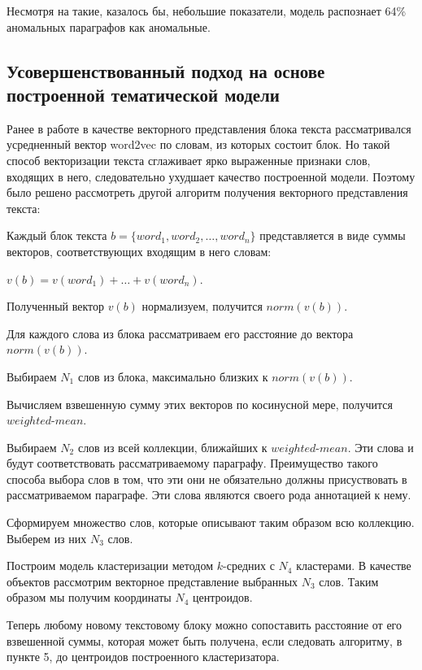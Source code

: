 \documentclass[12pt]{article}
\newcounter{c_tab}
\begin{document}
Несмотря на такие, казалось бы, небольшие показатели, модель распознает 64\% аномальных параграфов как аномальные.

\subsection{Усовершенствованный подход на основе построенной тематической модели}
Ранее в работе в качестве векторного представления блока текста рассматривался усредненный вектор word2vec по словам, из которых состоит блок. Но такой способ векторизации текста сглаживает ярко выраженные признаки слов, входящих в него, следовательно ухудшает качество построенной модели. Поэтому было решено рассмотреть другой алгоритм получения векторного представления текста:
\par\begin{enumerate}{
		\vspace{-0.2cm}\item Каждый блок текста	$b = \{word_1, word_2, …, word_n\}$ представляется в виде суммы векторов, соответствующих входящим в него словам:
		
		\noindent $v(b) = v(word_1) +\ldots + v(word_n)$.
		
		\vspace{-0.2cm}\item Полученный вектор $v(b)$ нормализуем, получится $norm(v(b))$.
		\vspace{-0.2cm}\item Для каждого слова из блока рассматриваем его расстояние до вектора $norm(v(b))$.
		\vspace{-0.2cm}\item Выбираем $N_1$ слов из блока, максимально близких к $norm(v(b))$.
		\vspace{-0.2cm}\item Вычисляем взвешенную сумму этих векторов по косинусной мере, получится $weighted$-$mean$.
		\vspace{-0.2cm}\item Выбираем $N_2$ слов из всей коллекции, ближайших к $weighted$-$mean$. Эти слова и будут соответствовать рассматриваемому параграфу.  Преимущество такого способа выбора слов в том, что эти они не обязательно должны присуствовать в рассматриваемом параграфе. Эти слова являются своего рода аннотацией к нему.
		\vspace{-0.2cm}\item Сформируем множество слов, которые описывают таким образом всю коллекцию. Выберем из них $N_3$ слов.
		\vspace{-0.2cm}\item Построим модель кластеризации методом $k$-средних с $N_4$ кластерами. В качестве объектов рассмотрим векторное представление выбранных $N_3$ слов. Таким образом мы получим координаты $N_4$ центроидов.
		\vspace{-0.2cm}\item Теперь любому новому текстовому блоку можно сопоставить расстояние от его взвешенной суммы, которая может быть получена, если следовать алгоритму, в пункте 5, до центроидов построенного кластеризатора.
}\end{enumerate}
\end{document}

